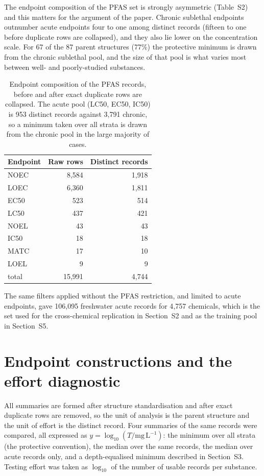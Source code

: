 \documentclass[11pt]{article}
\begin{document}
The endpoint composition of the PFAS set is strongly asymmetric
(Table~S2) and this matters for the argument of the paper. Chronic sublethal
endpoints outnumber acute endpoints four to one among distinct records (fifteen
to one before duplicate rows are collapsed), and they also lie lower on the
concentration scale. For 67 of the 87 parent structures (77\%) the protective
minimum is drawn from the chronic sublethal pool, and the size of that pool is
what varies most between well- and poorly-studied substances.

\begin{table}[h]
\centering
\caption{Endpoint composition of the PFAS records, before and after exact
duplicate rows are collapsed. The acute pool (LC50, EC50, IC50) is 953 distinct
records against 3{,}791 chronic, so a minimum taken over all strata is drawn
from the chronic pool in the large majority of cases.}
\small
\begin{tabular}{lrr}
\toprule
Endpoint & Raw rows & Distinct records \\
\midrule
NOEC & 8{,}584 & 1{,}918 \\
LOEC & 6{,}360 & 1{,}811 \\
EC50 & 523     & 514 \\
LC50 & 437     & 421 \\
NOEL & 43      & 43 \\
IC50 & 18      & 18 \\
MATC & 17      & 10 \\
LOEL & 9       & 9 \\
\midrule
total & 15{,}991 & 4{,}744 \\
\bottomrule
\end{tabular}
\end{table}

The same filters applied without the PFAS restriction, and limited to acute
endpoints, gave 106{,}095 freshwater acute records for 4{,}757 chemicals, which
is the set used for the cross-chemical replication in Section~S2 and as the
training pool in Section~S5.

\section{Endpoint constructions and the effort diagnostic}

All summaries are formed after structure standardisation and after exact
duplicate rows are removed, so the unit of analysis is the parent structure and
the unit of effort is the distinct record. Four summaries of the same records
were compared, all expressed as
$y=\log_{10}(T/\mathrm{mg\,L^{-1}})$: the minimum over all strata (the
protective convention), the median over the same records, the median over acute
records only, and a depth-equalised minimum described in Section~S3. Testing
effort was taken as $\log_{10}$ of the number of usable records per substance.
\end{document}
